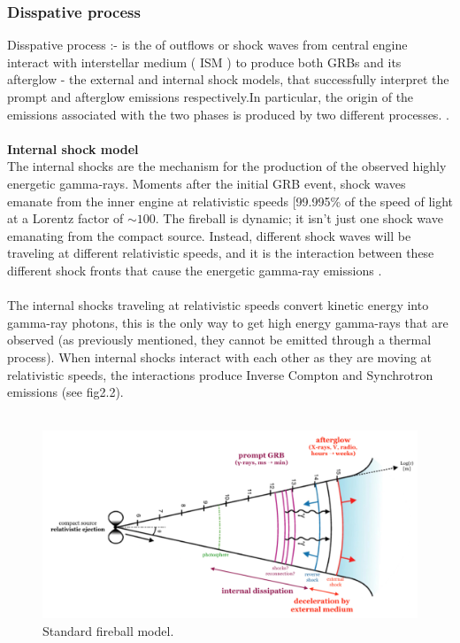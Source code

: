 \subsubsection{Disspative process}
Disspative process :- is the  of outflows or shock waves from central engine  interact with interstellar medium ( ISM ) to produce both GRBs and its afterglow - the external and internal shock models, that  successfully interpret the prompt and afterglow emissions respectively.In particular, the origin of the emissions associated with the two phases is produced by two different processes. \citep{8} \citep{17}.\\\\
\textbf{Internal shock model}\\
The internal shocks are the mechanism for the production of the observed highly energetic gamma-rays. Moments after the initial GRB event, shock waves emanate from the inner engine at relativistic speeds [99.995\%  of the speed of light at a Lorentz factor of $ \sim 100 $. The fireball is dynamic; it isn't just one shock wave emanating from the compact source. Instead, different shock waves will  be traveling at different relativistic speeds, and it is the interaction between these different shock fronts that cause the energetic gamma-ray emissions \citep{17}\citep{18}.\\\\
The internal shocks traveling  at relativistic speeds  convert  kinetic energy into gamma-ray photons, this is  the only way to  get high  energy gamma-rays that are observed (as previously mentioned, they cannot be emitted through a thermal process). When  internal shocks interact with  each  other as they  are  moving  at  relativistic  speeds, the  interactions  produce  Inverse  Compton and Synchrotron emissions\citep{18} (see fig2.2).\\\\
\begin{figure}[h]
\begin{center}
\includegraphics[scale=0.3]{Figures/fig6.png}
\caption{Standard fireball model.}
\end{center}
\end{figure}
